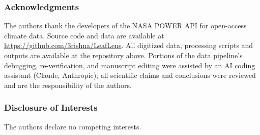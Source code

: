 \documentclass[runningheads]{llncs}
\providecommand{\ackname}{Acknowledgments}
\providecommand{\discintname}{Disclosure of Interests}
\newenvironment{credits}{\par\addvspace{1.5em}\small}{\par\addvspace{0.5em}}%
\begin{document}
\begin{credits}
\subsubsection{\ackname}
The authors thank the developers of the NASA POWER API for open-access climate data. Source code and data are available at \url{https://github.com/3rishna/LeafLens}. All digitized data, processing scripts and outputs are available at the repository above. Portions of the data pipeline's debugging, re-verification, and manuscript editing were assisted by an AI coding assistant (Claude, Anthropic); all scientific claims and conclusions were reviewed and are the responsibility of the authors.

\subsubsection{\discintname}
The authors declare no competing interests.
\end{credits}
%
%
\end{document}
